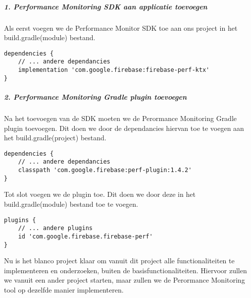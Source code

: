 \subparagraph{1. Performance Monitoring SDK aan applicatie toevoegen}
Als eerst voegen we de Performance Monitor SDK toe aan ons project in het build.gradle(module) bestand.
\begin{verbatim}
dependencies {
    // ... andere dependancies
    implementation 'com.google.firebase:firebase-perf-ktx'
}
\end{verbatim}

\subparagraph{2. Performance Monitoring Gradle plugin toevoegen}
Na het toevoegen van de SDK moeten we de Perormance Monitoring Gradle plugin toevoegen. 
Dit doen we door de dependancies hiervan toe te voegen aan het build.gradle(project) bestand.
\begin{verbatim}
dependencies {
    // ... andere dependancies
    classpath 'com.google.firebase:perf-plugin:1.4.2'
}
\end{verbatim}
Tot slot voegen we de plugin toe. Dit doen we door deze in het build.gradle(module) bestand toe te voegen.
\begin{verbatim}
plugins {
    // ... andere plugins
    id 'com.google.firebase.firebase-perf'
}
\end{verbatim}
Nu is het blanco project klaar om vanuit dit project alle functionaliteiten te 
implementeren en onderzoeken, buiten de basisfunctionaliteiten. Hiervoor zullen we vanuit een ander project starten, 
maar zullen we de Perormance Monitoring tool op dezelfde manier implementeren.
